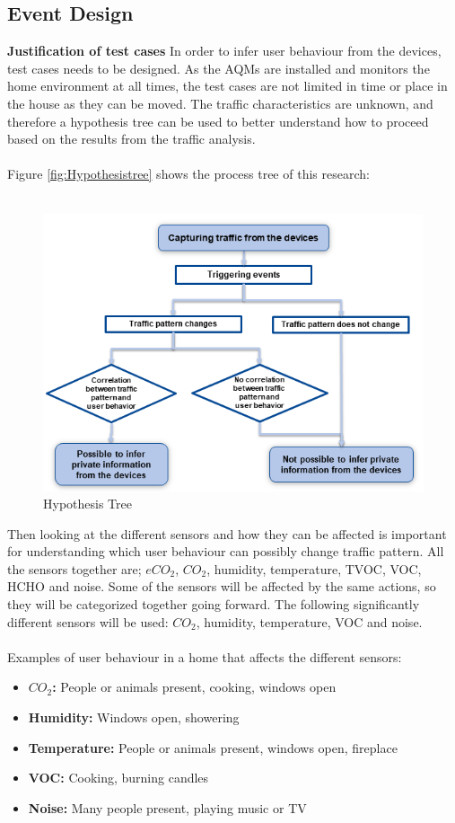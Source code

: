 \subsection{Event Design}
\textbf{Justification of test cases}
In order to infer user behaviour from the devices, test cases needs to be designed. As the AQMs are installed and monitors the home environment at all times, the test cases are not limited in time or place in the house as they can be moved. The traffic characteristics are unknown, and therefore a hypothesis tree can be used to better understand how to proceed based on the results from the traffic analysis. 
\\\\
Figure \ref{fig:Hypothesistree} shows the process tree of this research:
\\\\
\begin{figure} [H]
    \includegraphics[width=1\textwidth]{figures/Hypothesistree.png}
    \caption{Hypothesis Tree}
    \label{fig:HypothesisTree}
\end{figure}

Then looking at the different sensors and how they can be affected is important for understanding which user behaviour can possibly change traffic pattern. All the sensors together are; \(eCO_2\), \(CO_2\), humidity, temperature, TVOC, VOC, HCHO and noise. Some of the sensors will be affected by the same actions, so they will be categorized together going forward. The following significantly different sensors will be used: \(CO_2\), humidity, temperature, VOC and noise. 
\\\\
Examples of user behaviour in a home that affects the different sensors:
\begin{itemize}
    \item \textbf{\(CO_2\):} People or animals present, cooking, windows open
    \item \textbf{Humidity:} Windows open, showering
    \item \textbf{Temperature:} People or animals present, windows open, fireplace
    \item \textbf{VOC:} Cooking, burning candles
    \item \textbf{Noise:} Many people present, playing music or TV
\end{itemize}

